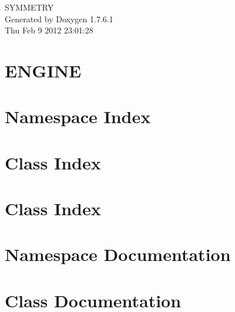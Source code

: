 \documentclass[a4paper]{book}
\begin{document}
\hypersetup{pageanchor=false,citecolor=blue}
\begin{titlepage}
\vspace*{7cm}
\begin{center}
{\Large \-S\-Y\-M\-M\-E\-T\-R\-Y }\\
\vspace*{1cm}
{\large \-Generated by Doxygen 1.7.6.1}\\
\vspace*{0.5cm}
{\small Thu Feb 9 2012 23:01:28}\\
\end{center}
\end{titlepage}
\clearemptydoublepage
{}
\tableofcontents
\clearemptydoublepage
{}
\hypersetup{pageanchor=true,citecolor=blue}
\chapter{\-E\-N\-G\-I\-N\-E}
\label{index}\hypertarget{index}{}
\chapter{\-Namespace \-Index}

\chapter{\-Class \-Index}

\chapter{\-Class \-Index}

\chapter{\-Namespace \-Documentation}

\chapter{\-Class \-Documentation}



















\printindex
\end{document}

